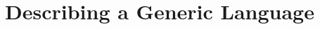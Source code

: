 \section{Describing a Generic Language}

\begin{code}%
\>[0]\AgdaSpace{}%
\AgdaSpace{}%
\<%
\end{code}